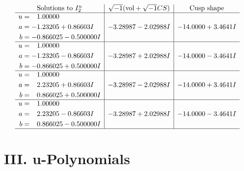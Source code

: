 \documentclass[1p]{elsarticle_modified}
\theoremstyle{definition}
\newcommand{\I}{\sqrt{-1}}
\begin{document}
$$\begin{array}{c|c|c}  
\text{Solutions to }I^u_{2}& \I (\text{vol} + \sqrt{-1}CS) & \text{Cusp shape}\\
 \hline 
\begin{aligned}
u &= \phantom{-}1.00000\phantom{ +0.000000I} \\
a &= -1.23205 + 0.86603 I \\
b &= -0.866025 - 0.500000 I\end{aligned}
 & -3.28987 - 2.02988 I & -14.0000 + 3.4641 I \\ \hline\begin{aligned}
u &= \phantom{-}1.00000\phantom{ +0.000000I} \\
a &= -1.23205 - 0.86603 I \\
b &= -0.866025 + 0.500000 I\end{aligned}
 & -3.28987 + 2.02988 I & -14.0000 - 3.4641 I \\ \hline\begin{aligned}
u &= \phantom{-}1.00000\phantom{ +0.000000I} \\
a &= \phantom{-}2.23205 + 0.86603 I \\
b &= \phantom{-}0.866025 + 0.500000 I\end{aligned}
 & -3.28987 - 2.02988 I & -14.0000 + 3.4641 I \\ \hline\begin{aligned}
u &= \phantom{-}1.00000\phantom{ +0.000000I} \\
a &= \phantom{-}2.23205 - 0.86603 I \\
b &= \phantom{-}0.866025 - 0.500000 I\end{aligned}
 & -3.28987 + 2.02988 I & -14.0000 - 3.4641 I\\
 \hline 
 \end{array}$$\newpage
\newpage\renewcommand{\arraystretch}{1}
\centering \section*{ III. u-Polynomials}
\end{document}
